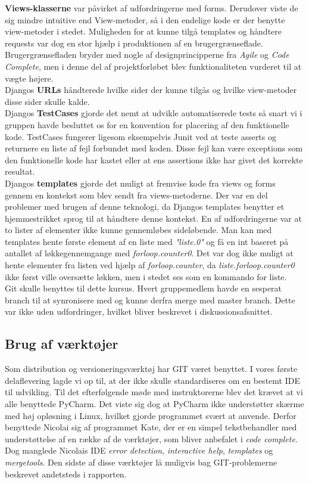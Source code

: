 \documentclass[]{article}
\begin{document}
\indent \textbf{Views-klasserne} var påvirket af udfordringerne med forms. Derudover viste de sig mindre intuitive end View-metoder, så i den endelige kode er der benytte view-metoder i stedet. Muligheden for at kunne tilgå templates og håndtere requests var dog en stor hjælp i produktionen af en brugergrænseflade. Brugergrænsefladen bryder med nogle af designprincipperne fra \textit{Agile} og \textit{Code Complete}, men i denne del af projektforløbet blev funktionaliteten vurderet til at vægte højere. \\
\indent Djangos \textbf{URLs} håndterede hvilke sider der kunne tilgås og hvilke view-metoder disse sider skulle kalde. \\
\indent Djangos \textbf{TestCases} gjorde det nemt at udvikle automatiserede tests så snart vi i gruppen havde besluttet os for en konvention for placering af den funktionelle kode. TestCases fungerer ligesom eksempelvis Junit ved at teste asserts og returnere en liste af fejl forbundet med koden. Disse fejl kan være exceptions som den funktionelle kode har kastet eller at ens assertions ikke har givet det korrekte resultat. \\
\indent Djangos \textbf{templates} gjorde det muligt at fremvise kode fra views og forms gennem en kontekst som blev sendt fra views-metoderne. Der var en del problemer med brugen af denne teknologi, da Djangos templates benytter et hjemmestrikket sprog til at håndtere denne kontekst. En af udfordringerne var at to lister af elementer ikke kunne gennemløbes sideløbende. Man kan med templates hente første element af en liste med \textit{"liste.0"} og få en int baseret på antallet af løkkegennemgange med \textit{forloop.counter0}. Det var dog ikke muligt at hente elementer fra listen ved hjælp af \textit{forloop.counter}, da \textit{liste.forloop.counter0} ikke først ville oversætte løkken, men i stedet ses som en kommando for liste. \\
\indent Git skulle benyttes til dette kursus. Hvert gruppemedlem havde en sesperat branch til at synronisere med og kunne derfra merge med master branch. Dette var ikke uden udfordringer, hvilket bliver beskrevet i diskussionsafsnittet.

\subsection{Brug af værktøjer}
Som distribution og versioneringsværktøj har GIT været benyttet.
I vores første delaflevering lagde vi op til, at der ikke skulle standardiseres om en bestemt IDE til udvikling. Til det efterfølgende møde med instruktorerne blev det krævet at vi alle benyttede PyCharm. Det viste sig dog at PyCharm ikke understøtter skærme med høj opløsning i Linux, hvilket gjorde programmet svært at anvende. Derfor benyttede Nicolai sig af programmet Kate, der er en simpel tekstbehandler med understøttelse af en række af de værktøjer, som bliver anbefalet i \textit{code complete}. Dog manglede Nicolais IDE \textit{error detection}, \textit{interactive help}, \textit{templates} og \textit{mergetools}. Den sidste af disse værktøjer lå muligvis bag GIT-problemerne beskrevet andetsteds i rapporten.
\end{document}
